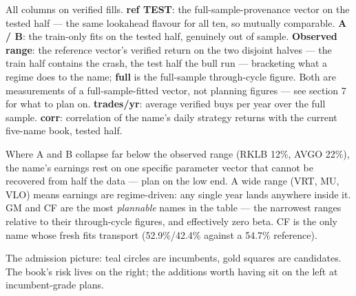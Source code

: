 \documentclass[11pt,a4paper]{article}
\newcommand{\tabnote}[1]{\begin{center}\begin{minipage}{0.92\textwidth}
  \footnotesize\color{bcgrey}#1\end{minipage}\end{center}}
\begin{document}
\tabnote{All columns on verified fills. \textbf{ref TEST}: the
full-sample-provenance vector on the tested half --- the same lookahead flavour for
all ten, so mutually comparable. \textbf{A / B}: the train-only fits on the tested
half, genuinely out of sample. \textbf{Observed range}: the reference vector's
verified return on the two disjoint halves --- the train half contains the crash,
the test half the bull run --- bracketing what a regime does to the name;
\textbf{full} is the full-sample through-cycle figure. Both are measurements of a
full-sample-fitted vector, not planning figures --- see section 7 for what to plan
on. \textbf{trades/yr}: average verified buys per year over the full sample.
\textbf{corr}: correlation of the name's daily strategy returns with the current
five-name book, tested half.}

Where A and B collapse far below the observed range (RKLB 12\%, AVGO 22\%), the
name's earnings rest on one specific parameter vector that cannot be recovered
from half the data --- plan on the low end. A wide range (VRT, MU, VLO) means
earnings are regime-driven: any single year lands anywhere inside it. GM and CF
are the most \emph{plannable} names in the table --- the narrowest ranges relative
to their through-cycle figures, and effectively zero beta. CF is the only name whose fresh fits
transport (52.9\%/42.4\% against a 54.7\% reference).

\begin{center}
\end{center}
\tabnote{The admission picture: teal circles are incumbents, gold squares are
candidates. The book's risk lives on the right; the additions worth having sit on
the left at incumbent-grade plans.}
\end{document}
